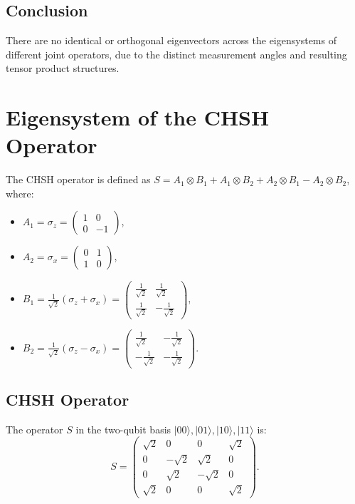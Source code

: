 \documentclass{article}
\begin{document}
\subsection*{Conclusion}
There are no identical or orthogonal eigenvectors across the eigensystems of different joint operators, due to the distinct measurement angles and resulting tensor product structures.

\section*{Eigensystem of the CHSH Operator}

The CHSH operator is defined as \( S = A_1 \otimes B_1 + A_1 \otimes B_2 + A_2 \otimes B_1 - A_2 \otimes B_2 \), where:
\begin{itemize}
    \item \( A_1 = \sigma_z = \begin{pmatrix} 1 & 0 \\ 0 & -1 \end{pmatrix} \),
    \item \( A_2 = \sigma_x = \begin{pmatrix} 0 & 1 \\ 1 & 0 \end{pmatrix} \),
    \item \( B_1 = \frac{1}{\sqrt{2}} (\sigma_z + \sigma_x) = \begin{pmatrix} \frac{1}{\sqrt{2}} & \frac{1}{\sqrt{2}} \\ \frac{1}{\sqrt{2}} & -\frac{1}{\sqrt{2}} \end{pmatrix} \),
    \item \( B_2 = \frac{1}{\sqrt{2}} (\sigma_z - \sigma_x) = \begin{pmatrix} \frac{1}{\sqrt{2}} & -\frac{1}{\sqrt{2}} \\ -\frac{1}{\sqrt{2}} & -\frac{1}{\sqrt{2}} \end{pmatrix} \).
\end{itemize}

\subsection*{CHSH Operator}
The operator \( S \) in the two-qubit basis \( |00\rangle, |01\rangle, |10\rangle, |11\rangle \) is:
\[
S = \begin{pmatrix}
\sqrt{2} & 0 & 0 & \sqrt{2} \\
0 & -\sqrt{2} & \sqrt{2} & 0 \\
0 & \sqrt{2} & -\sqrt{2} & 0 \\
\sqrt{2} & 0 & 0 & \sqrt{2}
\end{pmatrix}.
\]
\end{document}
